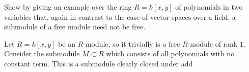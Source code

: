 \begin{problem}
Show by giving an example over the ring $R = k[x,y]$ of polynomials in two variables that, again in contrast to the case of vector spaces over a field, a submodule of a free module need not be free.
\end{problem}

Let $R = k[x,y]$ be an $R$-module, so it trivially is a free $R$-module of rank $1$. Consider the submodule $M\subset R$ which consists of all polynomials with no constant term. This is a submodule clearly closed under add